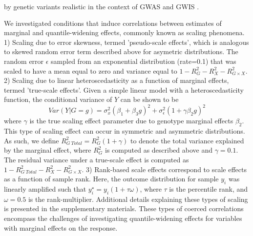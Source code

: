 \documentclass[12pt]{article}
\begin{document}
by genetic variants realistic in the context of GWAS and GWIS \cite{wang2015review}.

We investigated conditions that induce correlations between estimates of marginal and quantile-widening effects, commonly known as scaling phenomena. 1) Scaling due to error skewness, termed 'pseudo-scale effects', which is analogous to skewed random error term described above for asymetric distributions. The random error $\epsilon$ sampled from an exponential distribution (rate=0.1) that was scaled to have a mean equal to zero and variance equal to $1 - R^{2}_G - R^{2}_X - R^{2}_{G \times X}$. 2) Scaling due to linear heteroscedasticity as a function of marginal effects, termed 'true-scale effects'. Given a simple linear model with a heteroscedasticity function, the conditional variance of $Y$ can be shown to be
\begin{equation} \label{TrueScaleMod}
Var(Y|G=g)=\sigma_x^2 (\beta_1+\beta_3 g)^2 + \sigma_\epsilon^2 (1+\gamma\beta_2 g)^2
\end{equation}
where $\gamma$ is the true scaling effect parameter due to genotype marginal effects $\beta_2$. This type of scaling effect can occur in symmetric and asymmetric distributions. As such, we define $R^{2}_{G\: Total} = R^{2}_{G} (1+\gamma)$ to denote the total variance explained by the marginal effect, where $R^{2}_{G}$ is computed as described above and $\gamma=0.1$. The residual variance under a true-scale effect is computed as $1 - R^{2}_{G\: Total} - R^{2}_X - R^{2}_{G \times X}$. 3) Rank-based scale effects correspond to scale effects as a function of sample rank. Here, the outcome distribution for sample $y_i$ was linearly amplified such that $y_i^\star=y_i(1 + \tau \omega)$, where $\tau$ is the percentile rank, and $\omega=0.5$ is the rank-multiplier. Additional details explaining these types of scaling is presented in the supplementary materials. These types of coerced correlations encompass the challenges of investigating quantile-widening effects for variables with marginal effects on the response. 
\end{document}
